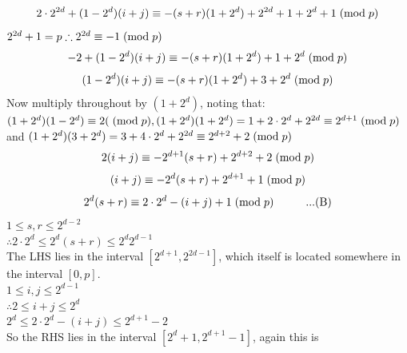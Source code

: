 \documentclass[
  12pt,
  a4paper]{book}
\begin{document}
\[2 \cdot 2^{2d} + (1-2^{d})(i+j) \equiv
-(s+r)(1+2^d)+2^{2d}+1+2^d+1 \hspace{0.1cm} (\mathrm{mod} \hspace{0.1cm} p)\]
\(2^{2d}+1=p \therefore 2^{2d} \equiv -1 \hspace{0.1cm} (\mathrm{mod} \hspace{0.1cm} p)\)
\[-2+(1-2^d)(i+j) \equiv -(s+r)(1+2^d)+1+2^d \hspace{0.1cm} (\mathrm{mod} \hspace{0.1cm} p)\]
\[(1-2^d)(i+j) \equiv -(s+r)(1+2^d)+3+2^d \hspace{0.1cm} (\mathrm{mod} \hspace{0.1cm} p)\]
Now multiply throughout by \((1+2^d)\), noting that:\\
\((1+2^d)(1-2^d) \equiv 2(\hspace{0.1cm} (\mathrm{mod} \hspace{0.1cm} p),(1+2^d)(1+2^d) =1+2 \cdot 2^d + 2^{2d} \equiv 2^{d+1}\hspace{0.1cm} (\mathrm{mod} \hspace{0.1cm} p)\)\\
and
\((1+2^d)(3+2^d)=3+4 \cdot 2^d+2^{2d} \equiv 2^{d+2}+2 \hspace{0.1cm} (\mathrm{mod} \hspace{0.1cm} p)\)\\
\[2(i+j)\equiv -2^{d+1}(s+r)+2^{d+2}+2\hspace{0.1cm} (\mathrm{mod} \hspace{0.1cm} p)\]
\[(i+j)\equiv -2^{d}(s+r)+2^{d+1}+1\hspace{0.1cm} (\mathrm{mod} \hspace{0.1cm} p)\]
\[2^d(s+r)\equiv 2 \cdot 2^{d}-(i+j)+1\hspace{0.1cm} (\mathrm{mod} \hspace{0.1cm} p) \hspace{1cm}... (\mathrm{B})\]
\(1 \leq s, r \leq 2^{d-2}\)\\
\(\therefore 2 \cdot 2^d \leq 2^d(s+r) \leq 2^d2^{d-1}\)\\
The LHS lies in the interval \([2^{d+1},2^{2d-1}]\), which itself is
located somewhere in the interval \([0,p]\).\\
\(1 \leq i, j \leq 2^{d-1}\)\\
\(\therefore 2 \leq i + j \leq 2^d\)\\
\(2^d \leq 2 \cdot 2^d -(i+j) \leq 2^{d+1} - 2\)\\
So the RHS lies in the interval \([2^d+1,2^{d+1}-1]\), again this is
\end{document}
